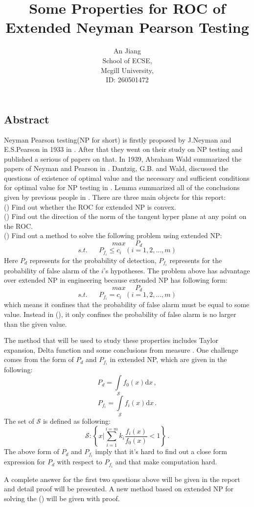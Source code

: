 \documentclass[12pt,a4paper]{article}
\author{An Jiang \\
School of ECSE,\\
Mcgill University,\\
ID:   260501472}
\title{Some Properties for ROC of Extended Neyman Pearson Testing}
\newcommand{\rmnum}[1]{\romannumeral #1}
\begin{document}
\begin{spacing}{2.0}
\maketitle
\section*{Abstract}
Neyman Pearson testing(NP for short) is firstly proposed by J.Neyman and E.S.Pearson in 1933 in \cite{neyman1933problem}. After that they went on their study on NP testing and published a serious of papers on that. In 1939, Abraham Wald summarized the papers of Neyman and Pearson in \cite{wald1939contributions}. Dantzig, G.B. and Wald, discussed the questions of existence of optimal value and the necessary and sufficient conditions for optimal value for NP testing in \cite{dantzig1951fundamental}. Lemma summarized all of the conclusions given by previous people in \cite{LehmannTest}.  
There are three main objects for this report:
\\(\rmnum{1}) Find out whether the ROC for extended NP is convex.
\\(\rmnum{2}) Find out the direction of the norm of the tangent hyper plane at any point on the ROC.
\\(\rmnum{3}) Find out a method  to solve the following problem using extended NP:
\[
  max \;\;\;\;\;P_d
  \]
  \[
  s.t. \;\;\;\;\;\;P_{f_i}\leq c_i \;\;(i=1,2,...,m)
  \]
  Here $P_d$ represents for the probability of detection, $P_{f_i}$ represents for the probability of false alarm of the $i$'s hypotheses. The problem above has advantage over extended NP in engineering because extended NP has following form\cite{LehmannTest}:
  \[
  max \;\;\;\;\;P_d
  \]
  \[
  s.t. \;\;\;\;\;\;P_{f_i}= c_i \;\;(i=1,2,...,m)
  \]
  which means it confines that the probability of false alarm must be equal to some value. Instead in (\rmnum{3}), it only confines the probability of false alarm is no larger than the given value.

  The method that will be used to study these properties includes Taylor expansion, Delta function \cite{hassani2009dirac} and some conclusions from measure \cite{halmmm}. One challenge comes from the form of  $P_d$ and $P_{f_i}$ in extended NP, which are given in the following:
  \[
  P_d = \int \limits_{\mathcal{S}} f_0(x) \mathrm{d} x\,,
  \]
  \[
   P_{f_i} = \int \limits_{\mathcal{S}} f_i(x) \mathrm{d} x\,.
   \]
   The set of $\mathcal{S}$ is defined as following:
   \[
    \mathcal{S} :  \left\{x \bigg| \sum_{i=1}^{i=m}k_i\frac{f_i(x)}{f_0(x)} < 1 \right\}\,.
   \]
   The above form of $P_d$ and $P_{f_i}$ imply that it's hard to find out a close form expression for $P_d$ with respect to $P_{f_i}$ and that make computation hard. 
   
   A complete answer for the first two questions above will be given in the report and detail proof will be presented. A new method based on extended NP for solving the (\rmnum{3}) will be given with  proof.

\end{spacing}
\end{document}
